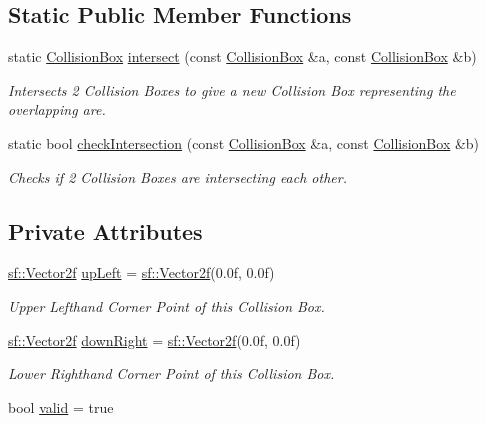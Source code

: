 \subsection*{Static Public Member Functions}
\begin{DoxyCompactItemize}
\item 
static \mbox{\hyperlink{class_collision_box}{Collision\+Box}} \mbox{\hyperlink{class_collision_box_a1417c712a2f07df65c2b3dfbfbb567e9}{intersect}} (const \mbox{\hyperlink{class_collision_box}{Collision\+Box}} \&a, const \mbox{\hyperlink{class_collision_box}{Collision\+Box}} \&b)
\begin{DoxyCompactList}\small\item\em Intersects 2 Collision Boxes to give a new Collision Box representing the overlapping are. \end{DoxyCompactList}\item 
static bool \mbox{\hyperlink{class_collision_box_af5c814148e50291a003d7ae48875afa9}{check\+Intersection}} (const \mbox{\hyperlink{class_collision_box}{Collision\+Box}} \&a, const \mbox{\hyperlink{class_collision_box}{Collision\+Box}} \&b)
\begin{DoxyCompactList}\small\item\em Checks if 2 Collision Boxes are intersecting each other. \end{DoxyCompactList}\end{DoxyCompactItemize}
\subsection*{Private Attributes}
\begin{DoxyCompactItemize}
\item 
\mbox{\label{class_collision_box_a00e0a4ff99f27a62cbdfe903b8c9bb1b}} 
\mbox{\hyperlink{classsf_1_1_vector2}{sf\+::\+Vector2f}} \mbox{\hyperlink{class_collision_box_a00e0a4ff99f27a62cbdfe903b8c9bb1b}{up\+Left}} = \mbox{\hyperlink{classsf_1_1_vector2}{sf\+::\+Vector2f}}(0.\+0f, 0.\+0f)
\begin{DoxyCompactList}\small\item\em Upper Lefthand Corner Point of this Collision Box. \end{DoxyCompactList}\item 
\mbox{\label{class_collision_box_a78d9e42ca6a4847697c3013fc9e1f774}} 
\mbox{\hyperlink{classsf_1_1_vector2}{sf\+::\+Vector2f}} \mbox{\hyperlink{class_collision_box_a78d9e42ca6a4847697c3013fc9e1f774}{down\+Right}} = \mbox{\hyperlink{classsf_1_1_vector2}{sf\+::\+Vector2f}}(0.\+0f, 0.\+0f)
\begin{DoxyCompactList}\small\item\em Lower Righthand Corner Point of this Collision Box. \end{DoxyCompactList}\item 
bool \mbox{\hyperlink{class_collision_box_ad1c8e359ccf41748322ee753a4fe4642}{valid}} = true
\end{DoxyCompactItemize}


